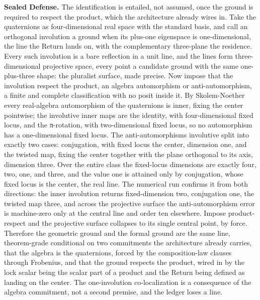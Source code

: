 \documentclass[10pt,twocolumn]{article}
\begin{document}
\textbf{Sealed Defense.} The identification is entailed, not assumed,
once the ground is required to respect the product, which the
architecture already wires in. Take the quaternions as four-dimensional
real space with the standard basis, and call an orthogonal involution a
ground when its plus-one eigenspace is one-dimensional, the line the
Return lands on, with the complementary three-plane the residence. Every
such involution is a bare reflection in a unit line, and the lines form
three-dimensional projective space, every point a candidate ground with
the same one-plus-three shape: the pluralist surface, made precise. Now
impose that the involution respect the product, an algebra automorphism
or anti-automorphism, a finite and complete classification with no posit
inside it. By Skolem-Noether every real-algebra automorphism of the
quaternions is inner, fixing the center pointwise; the involutive inner
maps are the identity, with four-dimensional fixed locus, and the
π-rotation, with two-dimensional fixed locus, so no automorphism has a
one-dimensional fixed locus. The anti-automorphisms involutive split
into exactly two cases: conjugation, with fixed locus the center,
dimension one, and the twisted map, fixing the center together with the
plane orthogonal to its axis, dimension three. Over the entire class the
fixed-locus dimensions are exactly four, two, one, and three, and the
value one is attained only by conjugation, whose fixed locus is the
center, the real line. The numerical run confirms it from both
directions: the inner involution returns fixed-dimension two,
conjugation one, the twisted map three, and across the projective
surface the anti-automorphism error is machine-zero only at the central
line and order ten elsewhere. Impose product-respect and the projective
surface collapses to its single central point, by force. Therefore the
geometric ground and the formal ground are the same line, theorem-grade
conditional on two commitments the architecture already carries, that
the algebra is the quaternions, forced by the composition-law clauses
through Frobenius, and that the ground respects the product, wired in by
the lock scalar being the scalar part of a product and the Return being
defined as landing on the center. The one-involution co-localization is
a consequence of the algebra commitment, not a second premise, and the
ledger loses a line.
\end{document}
